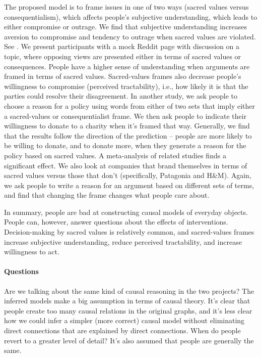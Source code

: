 The proposed model is to frame issues in one of two ways (sacred values versus
consequentialism), which affects people's subjective understanding, which leads to
either compromise or outrage.
We find that subjective understanding increases aversion to compromise and tendency to
outrage when sacred values are violated.
See \textcites{Fernbach2018}.
We present participants with a mock Reddit page with discussion on a topic, where
opposing views are presented either in terms of sacred values or consequences.
People have a higher sense of understanding when arguments are framed in terms of
sacred values.
Sacred-values frames also decrease people's willingness to compromise (perceived
tractability), i.e., how likely it is that the parties could resolve their
disagreement.
In another study, we ask people to choose a reason for a policy using words from either
of two sets that imply either a sacred-values or consequentialist frame.
We then ask people to indicate their willingness to donate to a charity when it's
framed that way.
Generally, we find that the results follow the direction of the prediction -- people
are more likely to be willing to donate, and to donate more, when they generate a
reason for the policy based on sacred values.
A meta-analysis of related studies finds a significant effect.
We also look at companies that brand themselves in terms of sacred values versus those
that don't (specifically, Patagonia and H\&M).
Again, we ask people to write a reason for an argument based on different sets of
terms, and find that changing the frame changes what people care about.

In summary, people are bad at constructing causal models of everyday objects.
People can, however, answer questions about the effects of interventions.
Decision-making by sacred values is relatively common, and sacred-values frames
increase subjective understanding, reduce perceived tractability, and increase
willingness to act.

\paragraph{Questions}
Are we talking about the same kind of causal reasoning in the two projects?
The inferred models make a big assumption in terms of causal theory.
It's clear that people create too many causal relations in the original graphs, and
it's less clear how we could infer a simpler (more correct) causal model without
eliminating direct connections that are explained by direct connections.
When do people revert to a greater level of detail?
It's also assumed that people are generally the same.
